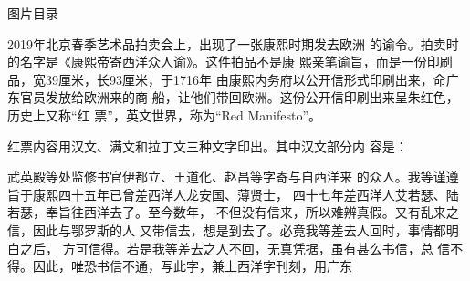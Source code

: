 \clearpage{}
\begingroup{}\setlength{\parskip}{0pt}\tableofcontents\endgroup
\clearpage{}
{\centering\bookhei\Large 图片目录\par}\vspace{18pt}
\begingroup\small{}\setlength{\parskip}{.5em}
\endgroup\clearpage{}
\par
2019年北京春季艺术品拍卖会上，出现了一张康熙时期发去欧洲%
的谕令。拍卖时的名字是《康熙帝寄西洋众人谕》。这件拍品不是康%
熙亲笔谕旨，而是一份印刷品，宽39厘米，长93厘米，于1716年%
由康熙内务府以公开信形式印刷出来，命广东官员发放给欧洲来的商%
船，让他们带回欧洲。这份公开信印刷出来呈朱红色，历史上又称“红%
票”，英文世界，称为“Red Manifesto”。%
\par
红票内容用汉文、满文和拉丁文三种文字印出。其中汉文部分内%
容是：%
\par
{\bookkai 武英殿等处监修书官伊都立、王道化、赵昌等字寄与自西洋来}%
{\bookkai 的众人。我等谨遵旨于康熙四十五年已曾差西洋人龙安国、薄贤士，}%
{\bookkai 四十七年差西洋人艾若瑟、陆若瑟，奉旨往西洋去了。至今数年，}%
{\bookkai 不但没有信来，所以难辨真假。又有乱来之信，因此与鄂罗斯的人}%
{\bookkai 又带信去，想是到去了。必竟我等差去人回时，事情都明白之后，}%
{\bookkai 方可信得。若是我等差去之人不回，无真凭据，虽有甚么书信，总}%
{\bookkai 信不得。因此，唯恐书信不通，写此字，兼上西洋字刊刻，用广东}%
